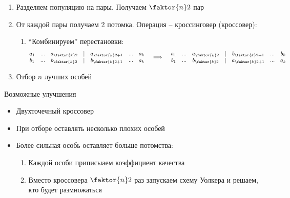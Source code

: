\begin{algorithm}
	\hfill
    \begin{enumerate}
        \item Разделяем популяцию на пары. Получаем $ \faktor{n}2 $ пар
        \item От каждой пары получаем 2 потомка. Операция -- кроссинговер (кроссовер):
        \begin{enumerate}
            \item ``Комбинируем'' перестановки:
            $$
            \begin{matrix}
                a_1 & ... & a_{\faktor{k}2} & | & a_{\faktor{k}2 + 1} & ... & a_k \\
                b_1 & ... & b_{\faktor{k}2} & | & b_{\faktor{k}2 + 1} & ... & a_k
            \end{matrix} \quad \implies \quad
            \begin{matrix}
                a_1 & ... & a_{\faktor{k}2} & | & b_{\faktor{k}2 + 1} & ... & b_k \\
                b_1 & ... & b_{\faktor{k}2} & | & a_{\faktor{k}2 + 1} & ... & a_k
            \end{matrix} $$
        \end{enumerate}
        \item Отбор $ n $ лучших особей
    \end{enumerate}
\end{algorithm}

\begin{undefthm}{Возможные улучшения}
	\hfill
    \begin{itemize}
    	\item Двухточечный кроссовер
        \item При отборе оставлять несколько плохих особей
        \item Более сильная особь оставляет больше потомства:
        \begin{enumerate}
        	\item Каждой особи приписыаем коэффициент качества
            \item Вместо кроссовера $ \faktor{n}2 $ раз запускаем схему Уолкера и решаем, кто будет размножаться
        \end{enumerate}
    \end{itemize}
\end{undefthm}
